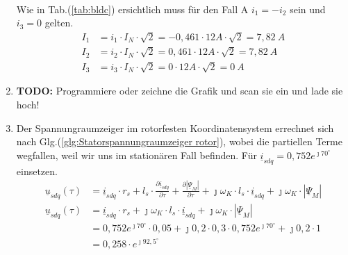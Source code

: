 \begin{solution}
\begin{enumerate}
\begin{align}
\end{align}
Wie in Tab.(\ref{tab:bldc}) ersichtlich muss für den Fall A $i_1= -i_2$ sein und $i_3= 0$ gelten.
\begin{align}
I_1 & = i_1 \cdot I_N \cdot \sqrt{2} = -0,461 \cdot 12 A \cdot \sqrt{2} =7,82~A \\
I_2 & = i_2 \cdot I_N \cdot \sqrt{2} = 0,461 \cdot 12 A \cdot \sqrt{2} =7,82~A \\
I_3 & = i_3 \cdot I_N \cdot \sqrt{2} =0 \cdot 12 A \cdot \sqrt{2} =0~A
\end{align}
\item \textbf{TODO:} Programmiere oder zeichne die Grafik und scan sie ein und lade sie hoch!
\item Der Spannungraumzeiger im rotorfesten Koordinatensystem errechnet sich nach Glg.(\ref{glg:Statorspannungraumzeiger rotor}), wobei die partiellen Terme wegfallen, weil wir uns im stationären Fall befinden. Für $\underline{i}_{sdq}= 0,752 e^{\jmath 70^\circ}$ einsetzen.
\begin{align}
\underline{u}_{sdq}(\tau) &= \underline{i}_{sdq} \cdot r_s + l_s \cdot \frac{\partial \underline{i}_{sdq}}{\partial \tau} + \frac{\partial |\underline{\Psi}_M|}{\partial \tau} + \jmath \omega_K \cdot l_s \cdot \underline{i}_{sdq} + \jmath \omega_K \cdot |\underline{\Psi}_M|\\
\underline{u}_{sdq}(\tau) &= \underline{i}_{sdq} \cdot r_s + \jmath \omega_K \cdot l_s \cdot \underline{i}_{sdq} + \jmath \omega_K \cdot |\underline{\Psi}_M|\\
&= 0,752 e^{\jmath 70^\circ} \cdot 0,05 + \jmath 0,2 \cdot 0,3 \cdot 0,752 e^{\jmath 70^\circ}+\jmath 0,2 \cdot 1\\
&=0,258 \cdot e^{\jmath 92,5^\circ}
\end{align}
\end{enumerate}
\end{solution}